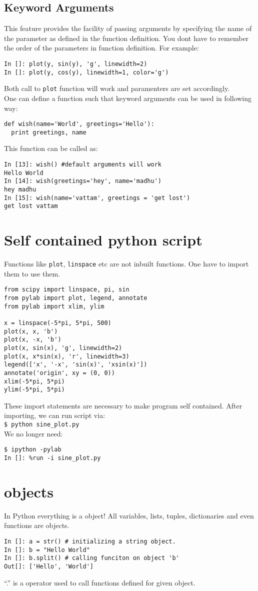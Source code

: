 \documentclass[12pt]{article}
\newcommand{\typ}[1]{\lstinline{#1}}
\begin{document}
\subsection{Keyword Arguments}
This feature provides the facility of passing arguments by specifying the name of the parameter as defined in the function definition. You dont have to remember the order of the parameters in function definition. For example:
\begin{lstlisting}
In []: plot(y, sin(y), 'g', linewidth=2)
In []: plot(y, cos(y), linewidth=1, color='g')
\end{lstlisting}
Both call to \typ{plot} function will work and paramenters are set accordingly.\\
One can define a function such that keyword arguments can be used in following way:
\begin{lstlisting}
def wish(name='World', greetings='Hello'):
  print greetings, name
\end{lstlisting}
This function can be called as:
\begin{lstlisting}
In [13]: wish() #default arguments will work
Hello World
In [14]: wish(greetings='hey', name='madhu')
hey madhu
In [15]: wish(name='vattam', greetings = 'get lost')
get lost vattam
\end{lstlisting}
\section{Self contained python script}
Functions like \typ{plot}, \typ{linspace} etc are not inbuilt functions. One have to import them to use them.
  \begin{lstlisting}
from scipy import linspace, pi, sin
from pylab import plot, legend, annotate
from pylab import xlim, ylim

x = linspace(-5*pi, 5*pi, 500)
plot(x, x, 'b')
plot(x, -x, 'b')
plot(x, sin(x), 'g', linewidth=2)
plot(x, x*sin(x), 'r', linewidth=3)
legend(['x', '-x', 'sin(x)', 'xsin(x)'])
annotate('origin', xy = (0, 0))
xlim(-5*pi, 5*pi)
ylim(-5*pi, 5*pi)
  \end{lstlisting}
These import statements are necessary to make program self contained. After importing, we can run script via:\\
\typ{$ python sine_plot.py} \\ %
We no longer need:
\begin{lstlisting}
$ ipython -pylab
In []: %run -i sine_plot.py
\end{lstlisting} %
\section{objects}
In Python everything is a object! All variables, lists, tuples, dictionaries and even functions are objects. 
\begin{lstlisting}
In []: a = str() # initializing a string object.
In []: b = "Hello World"
In []: b.split() # calling funciton on object 'b'
Out[]: ['Hello', 'World']
\end{lstlisting}
``.'' is a operator used to call functions defined for given object.
\end{document}
